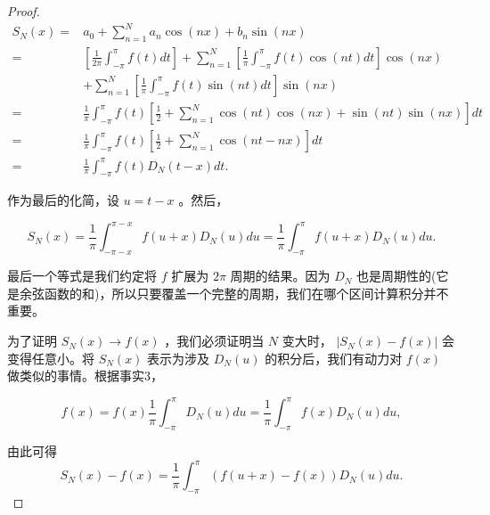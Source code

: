 \begin{proof}
\begin{align*}
{S}_{N}\left( x\right)  = & {a}_{0} + \mathop{\sum }\limits_{{n = 1}}^{N}{a}_{n}\cos \left( {nx}\right)  + {b}_{n}\sin \left( {nx}\right)\\
=& \left\lbrack  {\frac{1}{2\pi }{\int }_{-\pi }^{\pi }f\left( t\right) {dt}}\right\rbrack   + \mathop{\sum }\limits_{{n = 1}}^{N}\left\lbrack  {\frac{1}{\pi }{\int }_{-\pi }^{\pi }f\left( t\right) \cos \left( {nt}\right) {dt}}\right\rbrack  \cos \left( {nx}\right)\\
& + \mathop{\sum }\limits_{{n = 1}}^{N}\left\lbrack  {\frac{1}{\pi }{\int }_{-\pi }^{\pi }f\left( t\right) \sin \left( {nt}\right) {dt}}\right\rbrack  \sin \left( {nx}\right)\\
= & \frac{1}{\pi }{\int }_{-\pi }^{\pi }f\left( t\right) \left\lbrack  {\frac{1}{2} + \mathop{\sum }\limits_{{n = 1}}^{N}\cos \left( {nt}\right) \cos \left( {nx}\right)  + \sin \left( {nt}\right) \sin \left( {nx}\right) }\right\rbrack  {dt}\\
= & \frac{1}{\pi }{\int }_{-\pi }^{\pi }f\left( t\right) \left\lbrack  {\frac{1}{2} + \mathop{\sum }\limits_{{n = 1}}^{N}\cos \left( {{nt} - {nx}}\right) }\right\rbrack  {dt}\\
= & \frac{1}{\pi }{\int }_{-\pi }^{\pi }f\left( t\right) {D}_{N}\left( {t - x}\right) {dt}.
\end{align*}

作为最后的化简，设 \(u = t - x\) 。然后，

\[
{S}_{N}\left( x\right)  = \frac{1}{\pi }{\int }_{-\pi  - x}^{\pi  - x}f\left( {u + x}\right) {D}_{N}\left( u\right) {du} = \frac{1}{\pi }{\int }_{-\pi }^{\pi }f\left( {u + x}\right) {D}_{N}\left( u\right) {du}.
\]

最后一个等式是我们约定将 \(f\) 扩展为 \({2\pi }\) 周期的结果。因为 \({D}_{N}\) 也是周期性的(它是余弦函数的和)，所以只要覆盖一个完整的周期，我们在哪个区间计算积分并不重要。

为了证明 \({S}_{N}\left( x\right)  \rightarrow  f\left( x\right)\) ，我们必须证明当 \(N\) 变大时， \(\left| {{S}_{N}\left( x\right)  - f\left( x\right) }\right|\) 会变得任意小。将 \({S}_{N}\left( x\right)\) 表示为涉及 \({D}_{N}\left( u\right)\) 的积分后，我们有动力对 \(f\left( x\right)\) 做类似的事情。根据事实3，

\[
f\left( x\right)  = f\left( x\right) \frac{1}{\pi }{\int }_{-\pi }^{\pi }{D}_{N}\left( u\right) {du} = \frac{1}{\pi }{\int }_{-\pi }^{\pi }f\left( x\right) {D}_{N}\left( u\right) {du},
\]

由此可得
\begin{equation}
\label{eq:8.3.11}
{S}_{N}\left( x\right)  - f\left( x\right)  = \frac{1}{\pi }{\int }_{-\pi }^{\pi }\left( {f\left( {u + x}\right)  - f\left( x\right) }\right) {D}_{N}\left( u\right) {du}.
\end{equation}


\end{proof}
